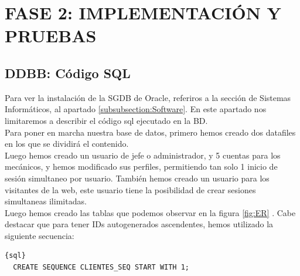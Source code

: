 \documentclass{article}
\begin{document}
\section{FASE 2: IMPLEMENTACIÓN Y PRUEBAS}
{
\subsection{DDBB: Código SQL}
Para ver la instalación de la SGDB de Oracle, referiros a la sección de Sistemas Informáticos, al apartado \ref{subsubsection:Software}. En este apartado nos limitaremos a describir el código sql ejecutado en la BD.\\
Para poner en marcha nuestra base de datos, primero hemos creado dos datafiles en los que se dividirá el contenido. \\ Luego hemos creado un usuario de jefe o administrador, y 5 cuentas para los mecánicos, y hemos modificado sus perfiles,
permitiendo tan solo 1 inicio de sesión simultaneo por usuario. También hemos creado un usuario para los visitantes de la web, este usuario tiene la posibilidad de crear sesiones simultaneas ilimitadas. \\ 
Luego hemos creado las tablas que podemos observar en la figura \ref{fig:ER} . Cabe destacar que para tener IDs autogenerados ascendentes, hemos utilizado la siguiente secuencia:\\
\begin{lstlisting}{sql}
  CREATE SEQUENCE CLIENTES_SEQ START WITH 1;


\end{lstlisting}}
\end{document}
